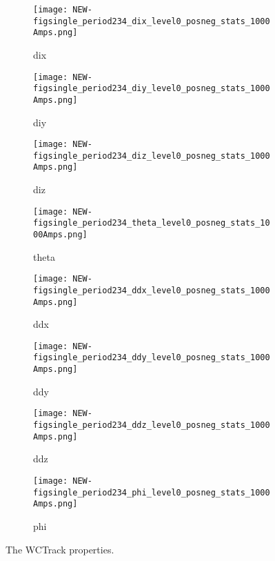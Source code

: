 \begin{figure}[h]
            \begin{subfigure}[b]{0.24\textwidth}
            \centering
            \texttt{[image: NEW-figsingle\_period234\_dix\_level0\_posneg\_stats\_1000Amps.png]}
            \caption{dix}
            \label{fig_dix1}
            \end{subfigure}
            \hfill             
             \begin{subfigure}[b]{0.24\textwidth}
            \centering
            \texttt{[image: NEW-figsingle\_period234\_diy\_level0\_posneg\_stats\_1000Amps.png]}
            \caption{diy}
            \label{fig_diy1}
            \end{subfigure}
             \hfill   
             \begin{subfigure}[b]{0.24\textwidth}
            \centering
            \texttt{[image: NEW-figsingle\_period234\_diz\_level0\_posneg\_stats\_1000Amps.png]}
            \caption{diz}
            \label{fig_diz1}
            \end{subfigure}
             \hfill   
             \begin{subfigure}[b]{0.24\textwidth}
            \centering
            \texttt{[image: NEW-figsingle\_period234\_theta\_level0\_posneg\_stats\_1000Amps.png]}
            \caption{theta}
            \label{fig_theta1}
            \end{subfigure}
            
            
                        \begin{subfigure}[b]{0.24\textwidth}
            \centering
            \texttt{[image: NEW-figsingle\_period234\_ddx\_level0\_posneg\_stats\_1000Amps.png]}
            \caption{ddx}
            \label{fig_ddx1}
            \end{subfigure}
            \hfill             
             \begin{subfigure}[b]{0.24\textwidth}
            \centering
            \texttt{[image: NEW-figsingle\_period234\_ddy\_level0\_posneg\_stats\_1000Amps.png]}
            \caption{ddy}
            \label{fig_ddy1}
            \end{subfigure}
             \hfill   
             \begin{subfigure}[b]{0.24\textwidth}
            \centering
            \texttt{[image: NEW-figsingle\_period234\_ddz\_level0\_posneg\_stats\_1000Amps.png]}
            \caption{ddz}
            \label{fig_ddz1}
            \end{subfigure}
             \hfill   
             \begin{subfigure}[b]{0.24\textwidth}
            \centering
            \texttt{[image: NEW-figsingle\_period234\_phi\_level0\_posneg\_stats\_1000Amps.png]}
            \caption{phi}
            \label{fig_phi1}
            \end{subfigure}
            
            
            
   \caption[short]{The WCTrack properties.}
   \label{fig_props_overview}
  \end{figure}
  
